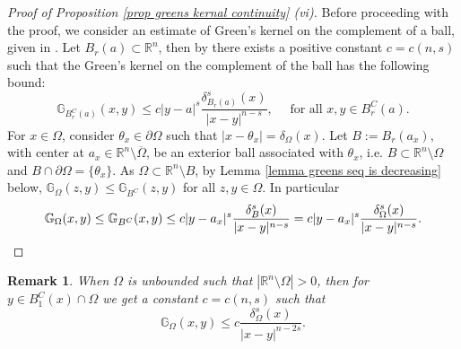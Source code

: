 \documentclass{amsart}
\newtheorem{remark}[theorem]{Remark}
\newcommand{\R}{\mathbb{R}}
\newcommand{\gk}[1]{\mathbb{G}_{#1}}
\begin{document}
\begin{proof}[Proof of Proposition \ref{prop greens kernal continuity} (vi)]
   Before proceeding with the proof, we consider an estimate of Green's kernel on the complement of a ball, given in \cite{ChenSong1998}. Let $B_{r}(a)\subset \R^{n}$, then by \cite[Lemma 2.5]{ChenSong1998} there exists a positive constant $c=c(n,s)$ such that the Green's kernel on the complement of the ball has the following bound:
   \begin{equation*}
       \gk{B_{r}^{C}(a)}(x,y)\leq c|y-a|^{s}\frac{\delta_{B_{r}(a)}^{s}(x)}{|x-y|^{n-s}}, \quad \text{ for all }x,y\in B^C_{r}(a).
   \end{equation*}
   For $x\in \Omega$, consider $\theta_x\in\partial\Omega$ such that $|x-\theta_x|=\delta_{\Omega}(x)$. Let $B:=B_{r}(a_x)$, with center at $a_x\in \R^{n}\setminus\overline\Omega$, be an exterior ball associated with $\theta_x$, i.e. $B\subset \R^{n}\setminus\Omega$ and $B\cap \partial\Omega=\{\theta_x\}$. As $\Omega\subset \R^{n}\setminus B$, by Lemma \ref{lemma greens seq is decreasing} below, $\gk{\Omega}(z,y)\leq \gk{B^{C}}(z,y)$ for all $z,y\in \Omega$. In particular 
   \begin{equation}\label{eqn behaviour of greens on unbounded domains}
           \gk{\Omega}(x,y)\leq \gk{B^{C}}(x,y) \leq c|y-a_x|^{s}\frac{\delta_{B}^{s}(x)}{|x-y|^{n-s}}=c|y-a_x|^{s}\frac{\delta_{\Omega}^{s}(x)}{|x-y|^{n-s}}. \qedhere
   \end{equation}
   \end{proof}

\begin{remark}
    When $\Omega$ is unbounded such that $|\R^{n}\setminus \Omega|>0$, then for $y \in B_1^C(x)\cap \Omega$  we get a constant $c = c(n,s)$ such that
    \begin{equation*}
        \gk{\Omega}(x,y)\leq c\frac{\delta_{\Omega}^{s}(x)}{|x-y|^{n-2s}}.
    \end{equation*}
\end{remark}
\end{document}
